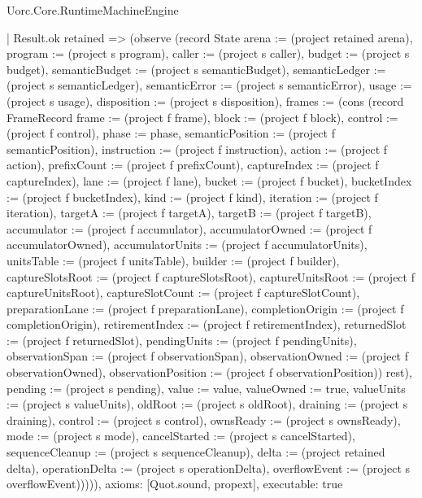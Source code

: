\begin{lexlean}{Uorc.Core.RuntimeMachineEngine}
\begin{semanticmodule}
{      | Result.ok retained => (observe (record State {arena := (project retained arena), program := (project s program), caller := (project s caller), budget := (project s budget), semanticBudget := (project s semanticBudget), semanticLedger := (project s semanticLedger), semanticError := (project s semanticError), usage := (project s usage), disposition := (project s disposition), frames := (cons (record FrameRecord {frame := (project f frame), block := (project f block), control := (project f control), phase := phase, semanticPosition := (project f semanticPosition), instruction := (project f instruction), action := (project f action), prefixCount := (project f prefixCount), captureIndex := (project f captureIndex), lane := (project f lane), bucket := (project f bucket), bucketIndex := (project f bucketIndex), kind := (project f kind), iteration := (project f iteration), targetA := (project f targetA), targetB := (project f targetB), accumulator := (project f accumulator), accumulatorOwned := (project f accumulatorOwned), accumulatorUnits := (project f accumulatorUnits), unitsTable := (project f unitsTable), builder := (project f builder), captureSlotsRoot := (project f captureSlotsRoot), captureUnitsRoot := (project f captureUnitsRoot), captureSlotCount := (project f captureSlotCount), preparationLane := (project f preparationLane), completionOrigin := (project f completionOrigin), retirementIndex := (project f retirementIndex), returnedSlot := (project f returnedSlot), pendingUnits := (project f pendingUnits), observationSpan := (project f observationSpan), observationOwned := (project f observationOwned), observationPosition := (project f observationPosition)}) rest), pending := (project s pending), value := value, valueOwned := true, valueUnits := (project s valueUnits), oldRoot := (project s oldRoot), draining := (project s draining), control := (project s control), ownsReady := (project s ownsReady), mode := (project s mode), cancelStarted := (project s cancelStarted), sequenceCleanup := (project s sequenceCleanup), delta := (project retained delta), operationDelta := (project s operationDelta), overflowEvent := (project s overflowEvent)})))),
  axioms: [Quot.sound, propext],
  executable: true
}


\end{semanticmodule}
\end{lexlean}
